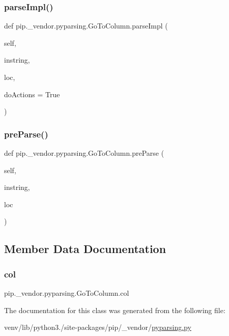 \subsubsection{\texorpdfstring{parse\+Impl()}{parseImpl()}}
{\footnotesize\ttfamily def pip.\+\_\+vendor.\+pyparsing.\+Go\+To\+Column.\+parse\+Impl (\begin{DoxyParamCaption}\item[{}]{self,  }\item[{}]{instring,  }\item[{}]{loc,  }\item[{}]{do\+Actions = {\ttfamily True} }\end{DoxyParamCaption})}

\mbox{\label{classpip_1_1__vendor_1_1pyparsing_1_1GoToColumn_afe6ab3f4f54d26779663e48b01b0680c}} 
\subsubsection{\texorpdfstring{pre\+Parse()}{preParse()}}
{\footnotesize\ttfamily def pip.\+\_\+vendor.\+pyparsing.\+Go\+To\+Column.\+pre\+Parse (\begin{DoxyParamCaption}\item[{}]{self,  }\item[{}]{instring,  }\item[{}]{loc }\end{DoxyParamCaption})}



\subsection{Member Data Documentation}
\mbox{\label{classpip_1_1__vendor_1_1pyparsing_1_1GoToColumn_a00d0bca6d6f5f0984b18f4f9cc90a350}} 
\subsubsection{\texorpdfstring{col}{col}}
{\footnotesize\ttfamily pip.\+\_\+vendor.\+pyparsing.\+Go\+To\+Column.\+col}



The documentation for this class was generated from the following file\+:\begin{DoxyCompactItemize}
\item 
venv/lib/python3./site-\/packages/pip/\+\_\+vendor/\hyperlink{pip_2__vendor_2pyparsing_8py}{pyparsing.\+py}\end{DoxyCompactItemize}
